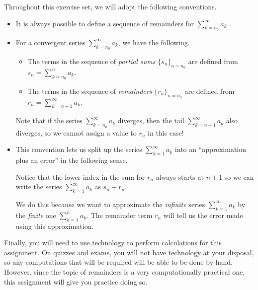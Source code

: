 \documentclass{ximera}
\author{Jim Talamo}
\begin{document}
\begin{exercise}
Throughout this exercise set, we will adopt the following conventions.

\begin{itemize}
\item It is always possible to define a sequence of remainders for $\sum_{k=n_0}^{\infty} a_k$  . 
\item For a convergent series $\sum_{k=n_0}^{\infty} a_k$, we have the following.

\begin{itemize}
\item The terms in the sequence of \emph{partial sums} $\{s_n\}_{n=n_0}$ are defined from $s_n = \sum_{k=n_0}^n a_k.$
\item  The terms in the sequence of \emph{remainders} $\{r_n\}_{n=n_0}$ are defined from $r_n = \sum_{k=n+1}^\infty a_k.$
\end{itemize}

Note that if the series $\sum_{k=n_0}^{\infty} a_k$ diverges, then the tail $\sum_{k=n+1}^{\infty} a_k$ also diverges, so we cannot assign a value to $r_n$ in this case!

\item This convention lets us split up the series $\sum_{k=1}^{\infty} a_k$ into an ``approximation plus an error'' in the following sense.

\begin{image}
  \end{image}
  
Notice that the lower index in the sum for $r_n$ always starts at $n+1$ so we can write the series $ \sum_{k=1}^{\infty} a_k$ as $s_n +r_n$.
  
  We do this because we want to approximate the \emph{infinite} series $\sum_{k=1}^{\infty} a_k$ by the \emph{finite} one $ \sum_{k=1}^{n} a_k$.  The remainder term $r_n$ will tell us the error made using this approximation.

\end{itemize}

Finally, you will need to use technology to perform calculations for this assignment.  On quizzes and exams, you will not have technology at your disposal, so any computations that will be required will be able to be done by hand.  However, since the topic of remainders is a very computationally practical one, this assignment will give you practice doing so. 
\end{exercise}
\end{document}
